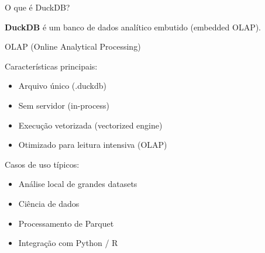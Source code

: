 \documentclass{beamer}
\begin{document}
\begin{frame}{O que é DuckDB?}
    
    \textbf{DuckDB} é um banco de dados analítico embutido (embedded OLAP).
    
    OLAP (Online Analytical Processing)
    
    \vspace{0.4cm}
    
    Características principais:
    
    \begin{itemize}
        \item Arquivo único (.duckdb)
        \item Sem servidor (in-process)
        \item Execução vetorizada (vectorized engine)
        \item Otimizado para leitura intensiva (OLAP)
    \end{itemize}
    
    \vspace{0.4cm}
    
    Casos de uso típicos:
    
    \begin{itemize}
        \item Análise local de grandes datasets
        \item Ciência de dados
        \item Processamento de Parquet
        \item Integração com Python / R
    \end{itemize}
    
\end{frame}
\end{document}
